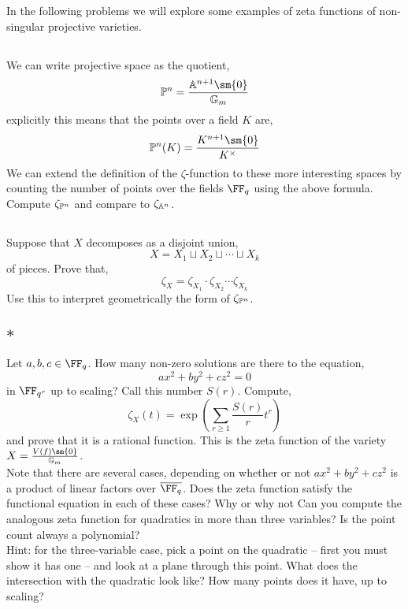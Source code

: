 \documentclass[12pt]{article}
\begin{document}
In the following problems we will explore some examples of zeta functions of non-singular projective varieties. 

\subsection{}

We can write projective space as the quotient,
\[ \P^n = \frac{\A^{n+1} \sm \{ 0 \}}{\Gm} \]
explicitly this means that the points over a field $K$ are,
\[ \P^n(K) = \frac{K^{n+1} \sm \{ 0 \}}{K^\times } \]
We can extend the definition of the $\zeta$-function to these more interesting spaces by counting the number of points over the fields $\FF_q$ using the above formula. Compute $\zeta_{\P^n}$ and compare to $\zeta_{\A^n}$.

\subsection{}

Suppose that $X$ decomposes as a disjoint union,
\[ X = X_1 \sqcup X_2 \sqcup \cdots \sqcup X_k \]
of pieces. Prove that,
\[ \zeta_X = \zeta_{X_1} \cdot \zeta_{X_2} \cdots \zeta_{X_k} \]
Use this to interpret geometrically the form of $\zeta_{\P^n}$.

\subsection{$\ast$}

Let $a,b,c \in \FF_q$. How many non-zero solutions are there to the equation,
\[ a x^2 + b y^2 + c z^2 = 0 \]
in $\FF_{q^r}$ up to scaling? Call this number $S(r)$. Compute,
\[ \zeta_X(t) = \exp{ \left( \sum_{r \ge 1} \frac{S(r)}{r} t^r \right) } \] 
and prove that it is a rational function. This is the zeta function of the variety $X = \frac{V(f) \sm \{ 0 \}}{\Gm}$.
\\
Note that there are several cases, depending on whether or not $a x^2 + b y^2 + c z^2$ is a product of linear factors over $\overline{\FF_q}$. Does the zeta function satisfy the functional equation in each of these cases? Why or why not Can you compute the analogous zeta function for quadratics in more than three variables? Is the point count always a polynomial?
\bigskip\\
Hint: for the three-variable case, pick a point on the quadratic -- first you must show it has one -- and look at a plane through this point. What does the intersection with the quadratic look like? How many points does it have, up to scaling?
\end{document}
